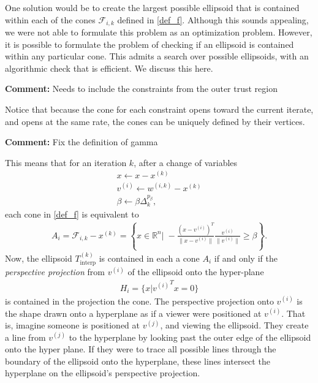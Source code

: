 \documentclass{article}
\newenvironment{comment}
  {\par\medskip
   \color{red}%
   \begin{framed}
   \textbf{Comment: }\ignorespaces}
 {\end{framed}
  \medskip}
\theoremstyle{case}
\newcommand{\xk}{{x^{(k)}}}
\newcommand{\Rn}{\mathbb R^n}
\newcommand{\dk}{\Delta_k}
\newcommand{\sampletrk}{{T_{\text{interp}}^{(k)}}}
\newcommand{\fik}{{\mathcal F_{i, k}}}
\newcommand{\wik}{{w^{(i, k)}}}
\begin{document}
One solution would be to create the largest possible ellipsoid that is contained within each of the cones $\fik$ defined in \cref{def_f}.
Although this sounds appealing, we were not able to formulate this problem as an optimization problem.
However, it is possible to formulate the problem of checking if an ellipsoid is contained within any particular cone.
This admits a search over possible ellipsoids, with an algorithmic check that is efficient.
We discuss this here.

\begin{comment}
Needs to include the constraints from the outer trust region
\end{comment}

Notice that because the cone for each constraint opens toward the current iterate, and opens at the same rate, the cones can be uniquely defined by their vertices.

\begin{comment}
Fix the definition of gamma
\end{comment}
This means that for an iteration $k$, after a change of variables
\begin{align}
x \gets x - \xk \\
v^{(i)}  \gets \wik - \xk \\
\beta \gets \beta \dk^{p_{\beta}},
\end{align}
each cone in \cref{def_f} is equivalent to
\begin{align*}
A_i = \fik - \xk = \left\{x\in\Rn\bigg|\;-\frac{(x - v^{(i)})^T}{\|x - v^{(i)}\|} \frac{v^{(i)}}{\|v^{(i)}\|} \ge \beta \right\}.
\end{align*}
Now, the ellipsoid $\sampletrk$ is contained in each a cone $A_i$ if and only if the \emph{perspective projection} from $v^{(i)}$ of the ellipsoid onto the hyper-plane 
\begin{align*}
H_i = \{x|{v^{(i)}}^Tx = 0\}
\end{align*}
is contained in the projection the cone.
The perspective projection onto $v^{(i)}$ is the shape drawn onto a hyperplane as if a viewer were positioned at $v^{(i)}$.
That is, imagine someone is positioned at $v^{(j)}$, and viewing the ellipsoid.
They create a line from $v^{(j)}$ to the hyperplane by looking past the outer edge of the ellipsoid onto the hyper plane.
If they were to trace all possible lines through the boundary of the ellipsoid onto the hyperplane, these lines intersect the hyperplane on the ellipsoid's perspective projection.
\end{document}
